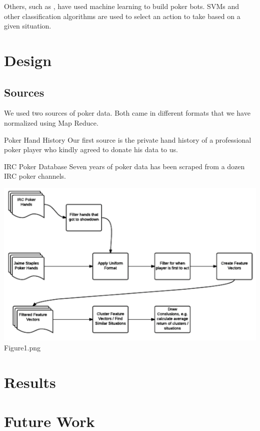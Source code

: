 \documentclass[twoside]{article}
\begin{document}
\begin{multicols}{2}
Others, such as \cite{holdemml}, have used machine learning to build poker bots. SVMs and other classification algorithms are used to select an action to take based on a given situation.


\section{Design}


\subsection{Sources}
We used two sources of poker data. Both came in different formats that we have normalized using Map Reduce. 
\begin{compactitem}
\item{Poker Hand History} Our first source is the private hand history of a professional poker player who kindly agreed to donate his data to us. 
\item{IRC Poker Database} Seven years of poker data has been scraped from a dozen IRC poker channels. 
\end{compactitem}

\includegraphics[scale=.5]{Flowchart.png}
Figure1.png



\section{Results}


\section{Future Work}


\end{multicols}
\end{document}
